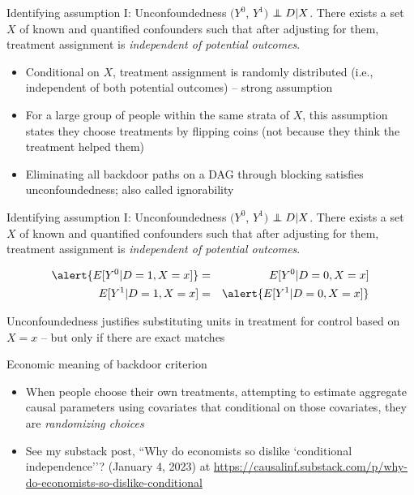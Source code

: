 \documentclass{beamer}
\newcommand\independent{\protect\mathpalette{\protect\independenT}{\perp}}
\def\independenT#1#2{\mathrel{\rlap{$#1#2$}\mkern2mu{#1#2}}}
\begin{document}
\begin{frame}[plain]

	\begin{block}{Identifying assumption I: Unconfoundedness}
	$(Y^0$, $Y^1)$ $\independent{D} | X$. There exists a set $X$ of known and quantified confounders such that after adjusting for them, treatment assignment is \emph{independent of potential outcomes}.
	\end{block}
	
	\begin{itemize}
	\item Conditional on $X$, treatment assignment is randomly distributed (i.e., independent of both potential outcomes) -- strong assumption
	\item For a large group of people within the same strata of $X$, this assumption states they choose treatments by flipping coins (not because they think the treatment helped them)
	\item Eliminating all backdoor paths on a DAG through blocking satisfies unconfoundedness; also called ignorability
	\end{itemize}
\end{frame}


\begin{frame}[plain]

	\begin{block}{Identifying assumption I: Unconfoundedness}
	$(Y^0$, $Y^1)$ $\independent{D} | X$. There exists a set $X$ of known and quantified confounders such that after adjusting for them, treatment assignment is \emph{independent of potential outcomes}.
	\end{block}
	
	\begin{eqnarray*}
	\alert{E[Y^0 | D=1, X=x]} &=& E[Y^0 | D=0, X=x] \\
	E[Y^1 | D=1, X=x] &=& \alert{E[Y^1 | D=0, X=x] }
	\end{eqnarray*}
	
Unconfoundedness justifies substituting units in treatment for control based on $X=x$ -- but only if there are exact matches
	
	
\end{frame}

\begin{frame}{Economic meaning of backdoor criterion}

\begin{itemize}
\item When people choose their own treatments, attempting to estimate aggregate causal parameters using covariates that conditional on those covariates, they are \emph{randomizing choices}
\item See my substack post, ``Why do economists so dislike `conditional independence''? (January 4, 2023) at \url{https://causalinf.substack.com/p/why-do-economists-so-dislike-conditional}
\end{itemize}

\end{frame}
\end{document}
